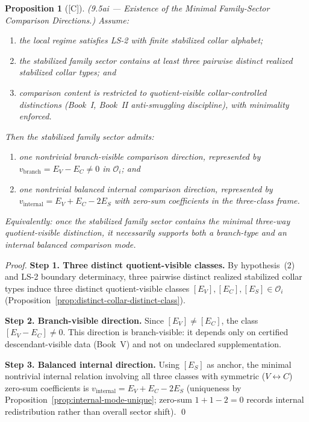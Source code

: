 \documentclass[12pt,oneside]{amsbook}
\theoremstyle{plain}
\newtheorem{proposition}[theorem]{Proposition}
\theoremstyle{definition}
\theoremstyle{remark}
\newcommand{\status}[1]{\textup{[#1]}}
\begin{document}
\begin{proposition}[\status{C}]\label{prop:minimal-family-sector-directions}
\textup{(9.5ai --- Existence of the Minimal Family-Sector Comparison Directions.)}
Assume:
\begin{enumerate}[label=\textup{(\arabic*)}]
  \item the local regime satisfies LS-2 with finite stabilized collar
    alphabet;
  \item the stabilized family sector contains at least three pairwise
    distinct realized stabilized collar types; and
  \item comparison content is restricted to quotient-visible
    collar-controlled distinctions (Book~I, Book~II anti-smuggling
    discipline), with minimality enforced.
\end{enumerate}
Then the stabilized family sector admits:
\begin{enumerate}[label=\textup{(\arabic*)}]
  \item one nontrivial \emph{branch-visible comparison direction},
    represented by $v_{\mathrm{branch}} = E_V - E_C \neq 0$ in
    $\mathcal{O}_i$; and
  \item one nontrivial \emph{balanced internal comparison direction},
    represented by $v_{\mathrm{internal}} = E_V + E_C - 2E_S$ with
    zero-sum coefficients in the three-class frame.
\end{enumerate}
Equivalently: once the stabilized family sector contains the minimal
three-way quotient-visible distinction, it necessarily supports both a
branch-type and an internal balanced comparison mode.
\end{proposition}

\begin{proof}
\textbf{Step 1. Three distinct quotient-visible classes.}
By hypothesis~(2) and LS-2 boundary determinacy, three pairwise
distinct realized stabilized collar types induce three distinct
quotient-visible classes $[E_V], [E_C], [E_S] \in \mathcal{O}_i$
(Proposition~\ref{prop:distinct-collar-distinct-class}).

\textbf{Step 2. Branch-visible direction.}
Since $[E_V] \neq [E_C]$, the class $[E_V - E_C] \neq 0$.  This
direction is branch-visible: it depends only on certified
descendant-visible data (Book~V) and not on undeclared
supplementation.

\textbf{Step 3. Balanced internal direction.}
Using $[E_S]$ as anchor, the minimal nontrivial internal relation
involving all three classes with symmetric ($V \leftrightarrow C$)
zero-sum coefficients is $v_{\mathrm{internal}} = E_V + E_C - 2E_S$
(uniqueness by Proposition~\ref{prop:internal-mode-unique}; zero-sum
$1+1-2=0$ records internal redistribution rather than overall
sector shift). \qed
\end{proof}
\end{document}
